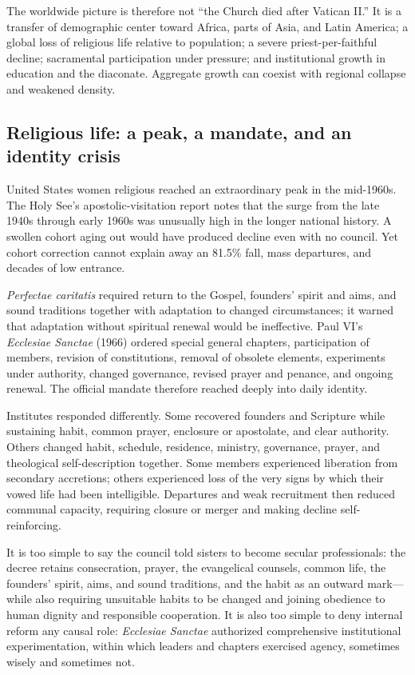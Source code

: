 The worldwide picture is therefore not “the Church died after Vatican II.” It is a transfer of demographic center toward Africa, parts of Asia, and Latin America; a global loss of religious life relative to population; a severe priest-per-faithful decline; sacramental participation under pressure; and institutional growth in education and the diaconate. Aggregate growth can coexist with regional collapse and weakened density.

\subsection{Religious life: a peak, a mandate, and an identity crisis}

United States women religious reached an extraordinary peak in the mid-1960s. The Holy See's apostolic-visitation report notes that the surge from the late 1940s through early 1960s was unusually high in the longer national history. A swollen cohort aging out would have produced decline even with no council. Yet cohort correction cannot explain away an 81.5\% fall, mass departures, and decades of low entrance.

\emph{Perfectae caritatis} required return to the Gospel, founders' spirit and aims, and sound traditions together with adaptation to changed circumstances; it warned that adaptation without spiritual renewal would be ineffective. Paul VI's \emph{Ecclesiae Sanctae} (1966) ordered special general chapters, participation of members, revision of constitutions, removal of obsolete elements, experiments under authority, changed governance, revised prayer and penance, and ongoing renewal. The official mandate therefore reached deeply into daily identity.

Institutes responded differently. Some recovered founders and Scripture while sustaining habit, common prayer, enclosure or apostolate, and clear authority. Others changed habit, schedule, residence, ministry, governance, prayer, and theological self-description together. Some members experienced liberation from secondary accretions; others experienced loss of the very signs by which their vowed life had been intelligible. Departures and weak recruitment then reduced communal capacity, requiring closure or merger and making decline self-reinforcing.

It is too simple to say the council told sisters to become secular professionals: the decree retains consecration, prayer, the evangelical counsels, common life, the founders' spirit, aims, and sound traditions, and the habit as an outward mark---while also requiring unsuitable habits to be changed and joining obedience to human dignity and responsible cooperation. It is also too simple to deny internal reform any causal role: \emph{Ecclesiae Sanctae} authorized comprehensive institutional experimentation, within which leaders and chapters exercised agency, sometimes wisely and sometimes not.


